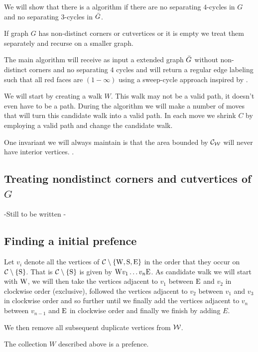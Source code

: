 

We will show that there is a algorithm if there are no separating $4$-cycles in $G$ and no separating $3$-cycles in $\bar{G}$.

If graph $G$ has non-distinct corners or cutvertices or it is empty we treat them separately and recurse on a smaller graph. 


The main algorithm will receive as input a extended graph $\bar{G}$ without non-distinct corners and no separating $4$ cycles and will return a regular edge labeling such that all red faces are $(1-\infty)$ using a sweep-cycle approach inspired by \Fusy {} \cite{Fusy2006}.

We will start by creating a walk $W$. This walk may not be a valid path, it doesn't even have to be a path. During the algorithm we will make a number of moves that will turn this candidate walk into a valid path. In each move we shrink $C$ by employing a valid path and change the candidate walk.

One invariant we will always maintain is that the area bounded by $\mathcal{C}_{\mathcal{W}}$ will never have interior vertices. .

\subsection{Treating nondistinct corners and cutvertices of $G$}
-Still to be written -

\subsection{Finding a initial prefence}
Let $v_i$ denote all the vertices of $\mathcal{C} \setminus \left\lbrace {\mathrm{W}, \mathrm{S}, \mathrm{E}} \right\rbrace$ in the order that they occur on $\mathcal{C} \setminus \left\lbrace {\mathrm{S}} \right\rbrace$.  That is $\mathcal{C} \setminus \left\lbrace {\mathrm{S}} \right\rbrace$ is given by $\mathrm{W} v_1 \ldots v_n \mathrm{E}$.
As candidate walk we will start with $\mathrm{W}$, we will then take the vertices adjacent to $v_1$ between $\mathrm{E}$ and $v_2$ in clockwise order (exclusive), followed the vertices adjacent to $v_2$ between $v_1$ and $v_3$ in clockwise order and so further until we finally add the vertices adjacent to $v_n$ between $v_{n-1}$ and $\mathrm{E}$ in clockwise order and finally we finish by adding $E$.

We then remove all subsequent duplicate vertices from $\mathcal{W}$.

\begin{lemma}
The collection $W$ described above is a prefence.
\end{lemma}

